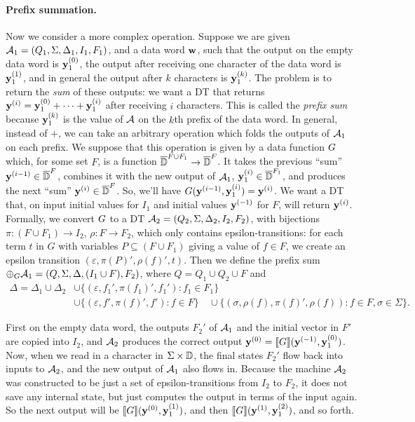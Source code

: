 \paragraph*{Prefix summation.}
Now we consider a more complex operation. Suppose we are given $\mathcal{A}_1 = (Q_{1}, \Sigma, \Delta_{1}, I_{1}, F_{1})$, and a data word $\mathbf{w}$, such that the output on the empty data word is $\mathbf{y}^{(0)}_1$, the output after receiving one character of the data word is $\mathbf{y}^{(1)}_1$, and in general the output after $k$ characters is $\mathbf{y}^{(k)}_1$. The problem is to return the \emph{sum} of these outputs: we want a DT that returns $\mathbf{y}^{(i)} = \mathbf{y}^{(0)}_1 + \cdots + \mathbf{y}^{(i)}_1$ after receiving $i$ characters. This is called the \emph{prefix sum} because $\mathbf{y}^{(k)}_1$ is the value of $\mathcal{A}$ on the $k$th prefix of the data word.
In general, instead of $+$, we can take an arbitrary operation which folds the outputs of $\mathcal{A}_1$ on each prefix. We suppose that this operation is given by a data function $G$ which, for some set $F$, is a function $\overline{\mathbb{D}{}}^{F \cup F_1} \to \overline{\mathbb{D}{}}^{F}$. It takes the previous ``sum'' $\mathbf{y}^{(i-1)} \in \overline{\mathbb{D}{}}^F$, combines it with the new output of $\mathcal{A}_1$, $\mathbf{y}_1^{(i)} \in \overline{\mathbb{D}{}}^{F_1}$, and produces the next ``sum'' $\mathbf{y}^{(i)} \in \overline{\mathbb{D}{}}^F$. So, we'll have $G(\mathbf{y}^{(i-1)},\mathbf{y}_1^{(i)}) = \mathbf{y}^{(i)}$. We want a DT that, on input initial values for $I_1$ and initial values $\mathbf{y}^{(-1)}$ for $F$, will return $\mathbf{y}^{(i)}$.
Formally, we convert $G$ to a DT $\mathcal{A}_2 = (Q_{2}, \Sigma, \Delta_{2}, I_{2}, F_{2})$, with bijections $\pi: (F \cup F_1) \to I_2$, $\rho: F \to F_2$, which only contains epsilon-transitions: for each term $t$ in $G$ with variables $P \subseteq (F \cup F_1)$ giving a value of $f \in F$, we create an epsilon transition $(\varepsilon, \pi(P)', \rho(f)', t)$. Then we define the prefix sum $\prefixsum{\DT_1}{\DF} = (Q, \Sigma, \Delta, (I_1 \cup F), F_2)$, where $Q = Q_1 \cup Q_2 \cup F$ and
\begin{align*}
\Delta = \Delta_1 \cup \Delta_2
    &\cup \big\{(\varepsilon, f_1', \pi(f_1)', f_1') : f_1 \in F_1 \big\} \\
    &\cup \big\{(\varepsilon, f', \pi(f)', f') : f \in F \big\}
    \quad \cup \big\{(\sigma, \rho(f), \pi(f)', \rho(f)) : f \in F, \sigma \in \Sigma \big\}.
\end{align*}

First on the empty data word, the outputs $F_2'$ of $\mathcal{A}_1$ and the initial vector in $F'$ are copied into $I_2$, and $\mathcal{A}_2$ produces the correct output $\mathbf{y}^{(0)} = \llbracket G \rrbracket(\mathbf{y}^{(-1)},\mathbf{y}_1^{(0)})$. Now, when we read in a character in $\Sigma \times \mathbb{D}$, the final states $F_2'$ flow back into inputs to $\mathcal{A}_2$, and the new output of $\mathcal{A}_1$ also flows in. Because the machine $\mathcal{A}_2$ was constructed to be just a set of epsilon-transitions from $I_2$ to $F_2$, it does not save any internal state, but just computes the output in terms of the input again. So the next output will be $\llbracket G \rrbracket(\mathbf{y}^{(0)},\mathbf{y}_1^{(1)})$, and then $\llbracket G \rrbracket(\mathbf{y}^{(1)},\mathbf{y}_1^{(2)})$, and so forth.

